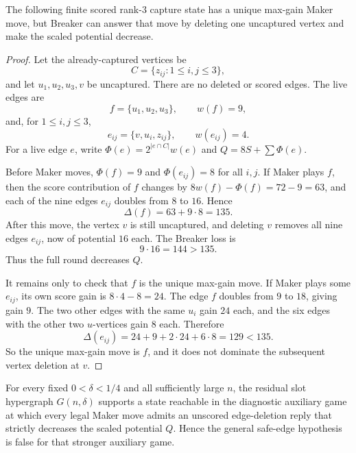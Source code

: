 \begin{proposition}
\label{prop:t2-max-gain-counterexample}
The following finite scored rank-$3$ capture state has a unique max-gain Maker
move, but Breaker can answer that move by deleting one uncaptured vertex and
make the scaled potential decrease.
\end{proposition}

\begin{proof}
Let the already-captured vertices be
\[
  C=\{z_{ij}:1\le i,j\le 3\},
\]
and let $u_1,u_2,u_3,v$ be uncaptured.  There are no deleted or scored edges.
The live edges are
\[
  f=\{u_1,u_2,u_3\},\qquad w(f)=9,
\]
and, for $1\le i,j\le 3$,
\[
  e_{ij}=\{v,u_i,z_{ij}\},\qquad w(e_{ij})=4.
\]
For a live edge $e$, write $\Phi(e)=2^{|e\cap C|}w(e)$ and
$Q=8S+\sum\Phi(e)$.

Before Maker moves, $\Phi(f)=9$ and $\Phi(e_{ij})=8$ for all $i,j$.  If Maker
plays $f$, then the score contribution of $f$ changes by
$8w(f)-\Phi(f)=72-9=63$, and each of the nine edges $e_{ij}$ doubles from
$8$ to $16$.  Hence
\[
  \Delta(f)=63+9\cdot 8=135.
\]
After this move, the vertex $v$ is still uncaptured, and deleting $v$ removes
all nine edges $e_{ij}$, now of potential $16$ each.  The Breaker loss is
\[
  9\cdot 16=144>135.
\]
Thus the full round decreases $Q$.

It remains only to check that $f$ is the unique max-gain move.  If Maker plays
some $e_{ij}$, its own score gain is $8\cdot4-8=24$.  The edge $f$ doubles
from $9$ to $18$, giving gain $9$.  The two other edges with the same $u_i$
gain $24$ each, and the six edges with the other two $u$-vertices gain $8$
each.  Therefore
\[
  \Delta(e_{ij})=24+9+2\cdot24+6\cdot8=129<135.
\]
So the unique max-gain move is $f$, and it does not dominate the subsequent
vertex deletion at $v$.
\end{proof}

\begin{proposition}
\label{prop:t2-safe-edge-refutation}
For every fixed $0<\delta<1/4$ and all sufficiently large $n$, the residual
slot hypergraph $G(n,\delta)$ supports a state reachable in the diagnostic
auxiliary game at which every legal Maker move admits an unscored edge-deletion
reply that strictly decreases the scaled potential $Q$.  Hence the general
safe-edge hypothesis is false for that stronger auxiliary game.
\end{proposition}


